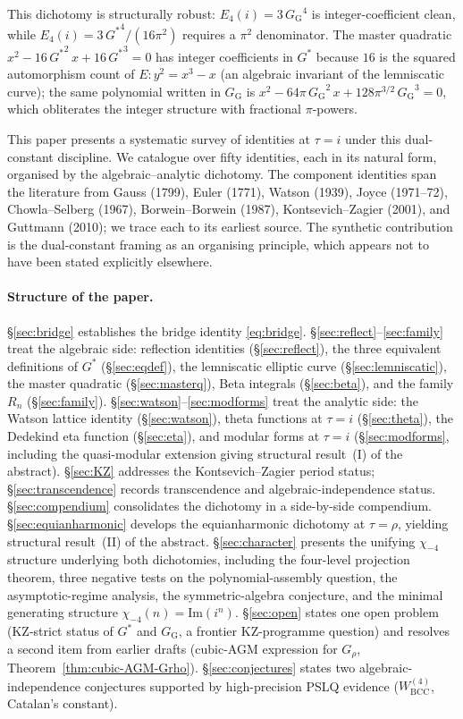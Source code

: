 \documentclass[11pt]{article}
\theoremstyle{definition}
\theoremstyle{remark}
\newcommand{\Gs}{G^{*}}
\newcommand{\Gss}{{G^{*}}^{2}}
\newcommand{\Gsss}{{G^{*}}^{3}}
\newcommand{\GG}{G_{\!\scriptscriptstyle\mathrm{G}}}
\begin{document}
This dichotomy is structurally robust: $E_4(i) = 3\,{\GG}^4$ is integer-coefficient
clean, while $E_4(i) = 3\,{\Gs}^4/(16\pi^2)$ requires a $\pi^2$ denominator. The
master quadratic $x^2 - 16\,\Gss\,x + 16\,\Gsss = 0$ has integer coefficients
in $\Gs$ because $16$ is the squared automorphism count of $E: y^2 = x^3 - x$
(an algebraic invariant of the lemniscatic curve); the same polynomial written
in $\GG$ is
$x^2 - 64\pi\,{\GG}^2\,x + 128\pi^{3/2}\,{\GG}^3 = 0$, which obliterates the
integer structure with fractional $\pi$-powers.

This paper presents a systematic survey of identities at $\tau = i$ under
this dual-constant discipline. We catalogue over fifty identities, each in
its natural form, organised by the algebraic--analytic dichotomy. The
component identities span the literature from Gauss (1799), Euler (1771),
Watson (1939), Joyce (1971--72), Chowla--Selberg (1967), Borwein--Borwein
(1987), Kontsevich--Zagier (2001), and Guttmann (2010); we trace each to
its earliest source. The synthetic contribution is the dual-constant
framing as an organising principle, which appears not to have been stated
explicitly elsewhere.

\paragraph{Structure of the paper.}
\S\ref{sec:bridge} establishes the bridge identity \eqref{eq:bridge}.
\S\ref{sec:reflect}--\ref{sec:family} treat the algebraic side: reflection
identities (\S\ref{sec:reflect}), the three equivalent definitions of $\Gs$
(\S\ref{sec:eqdef}), the lemniscatic elliptic curve (\S\ref{sec:lemniscatic}),
the master quadratic (\S\ref{sec:masterq}), Beta integrals
(\S\ref{sec:beta}), and the family $R_n$ (\S\ref{sec:family}).
\S\ref{sec:watson}--\ref{sec:modforms} treat the analytic side: the Watson
lattice identity (\S\ref{sec:watson}), theta functions at $\tau = i$
(\S\ref{sec:theta}), the Dedekind eta function (\S\ref{sec:eta}), and
modular forms at $\tau = i$ (\S\ref{sec:modforms}, including the
quasi-modular extension giving structural result~(I) of the abstract).
\S\ref{sec:KZ} addresses the Kontsevich--Zagier period status;
\S\ref{sec:transcendence} records transcendence and algebraic-independence
status. \S\ref{sec:compendium} consolidates the dichotomy in a
side-by-side compendium. \S\ref{sec:equianharmonic} develops the
equianharmonic dichotomy at $\tau = \rho$, yielding structural
result~(II) of the abstract. \S\ref{sec:character} presents the
unifying $\chi_{-4}$ structure underlying both dichotomies, including
the four-level projection theorem, three negative tests on the
polynomial-assembly question, the asymptotic-regime analysis, the
symmetric-algebra conjecture, and the minimal generating structure
$\chi_{-4}(n) = \mathrm{Im}(i^{n})$.
\S\ref{sec:open} states one open problem (KZ-strict status of $\Gs$ and
$\GG$, a frontier KZ-programme question) and resolves a second item
from earlier drafts (cubic-AGM expression for $G_\rho$,
Theorem~\ref{thm:cubic-AGM-Grho}). \S\ref{sec:conjectures} states two
algebraic-independence conjectures supported by high-precision PSLQ
evidence ($W^{(4)}_{\mathrm{BCC}}$, Catalan's constant).
\end{document}
